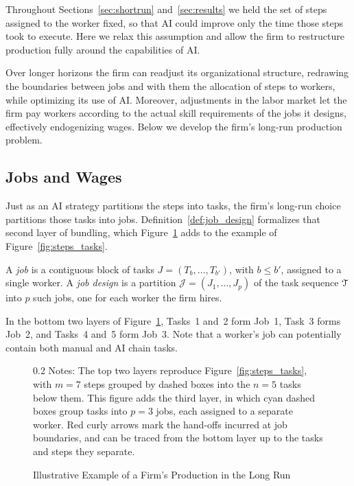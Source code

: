 Throughout Sections~\ref{sec:shortrun} and~\ref{sec:results} we held the set of steps assigned to the worker fixed, so that AI could improve only the time those steps took to execute.
Here we relax this assumption and allow the firm to restructure production fully around the capabilities of AI.

Over longer horizons the firm can readjust its organizational structure, redrawing the boundaries between jobs and with them the allocation of steps to workers, while optimizing its use of AI.
Moreover, adjustments in the labor market let the firm pay workers according to the actual skill requirements of the jobs it designs, effectively endogenizing wages.
Below we develop the firm's long-run production problem.

\subsection{Jobs and Wages}
\label{sec:longrun.jobdesign}

Just as an AI strategy partitions the steps into tasks, the firm's long-run choice partitions those tasks into jobs.
Definition~\ref{def:job_design} formalizes that second layer of bundling, which Figure~\ref{fig:hierarchical_production} adds to the example of Figure~\ref{fig:steps_tasks}.

\begin{definition}
\label{def:job_design}
A \emph{job} is a contiguous block of tasks $J = (T_b, \dotsc, T_{b'})$, with $b \leq b'$, assigned to a single worker.
A \emph{job design} is a partition $\mathcal{J} = (J_1, \dotsc, J_p)$ of the task sequence $\mathcal{T}$ into $p$ such jobs, one for each worker the firm hires.
\end{definition}
In the bottom two layers of Figure~\ref{fig:hierarchical_production}, Tasks~1 and~2 form Job~1, Task~3 forms Job~2, and Tasks~4 and~5 form Job~3.
Note that a worker's job can potentially contain both manual and AI chain tasks.

\begin{figure}[!t]
  \centering
  \caption{Illustrative Example of a Firm's Production in the Long Run}
  \label{fig:hierarchical_production}
  

  \par\vspace{\fignotesskip}
\begin{minipage}{1\linewidth}
\begin{spacing}{0.2}
{\fontsize{9.5pt}{10pt}\selectfont Notes: The top two layers reproduce Figure~\ref{fig:steps_tasks}, with $m=7$ steps grouped by dashed boxes into the $n=5$ tasks below them.
This figure adds the third layer, in which cyan dashed boxes group tasks into $p=3$ jobs, each assigned to a separate worker.
Red curly arrows mark the hand-offs incurred at job boundaries, and can be traced from the bottom layer up to the tasks and steps they separate.}
\end{spacing}
\end{minipage}
\end{figure}

